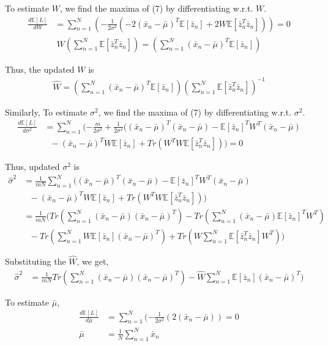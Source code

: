 \begin{enumerate}
	To estimate $W$, we find the maxima of (7) by differentiating w.r.t. $W$. 
	\begin{align*}
		\frac{d\mathbb{E}[L]}{dW} &= \sum_{n = 1}^N ( -\frac{1}{2 \sigma^2} ( - 2 (\bar{x}_n - \bar{\mu})^T\mathbb{E}[\bar{z}_n] + 2W\mathbb{E}[\bar{z}_n^T\bar{z}_n])) = 0 \nonumber 
	\end{align*}
	\begin{align*}
		W(\sum_{n = 1}^N \mathbb{E}[\bar{z}_n^T\bar{z}_n]) = (\sum_{n = 1}^N (\bar{x}_n - \bar{\mu})^T\mathbb{E}[\bar{z}_n] )
	\end{align*}
	
	Thus, the updated $W$ is 
	\begin{align}
		\hat{W} = (\sum_{n = 1}^N (\bar{x}_n - \bar{\mu})^T\mathbb{E}[\bar{z}_n] )(\sum_{n = 1}^N \mathbb{E}[\bar{z}_n^T\bar{z}_n])^{-1}
	\end{align}
	
	Similarly, To estimate $\sigma^2$, we find the maxima of (7) by differentiating w.r.t. $\sigma^2$. 
	\begin{align*}
		\frac{d\mathbb{E}[L]}{d\sigma^2} &= \sum_{n = 1}^N ( -\frac{m}{2\sigma^2} + \frac{1}{2 \sigma^4} ((\bar{x}_n - \bar{\mu})^T (\bar{x}_n -  \bar{\mu}) - \mathbb{E}[\bar{z}_n]^TW^T(\bar{x}_n - \bar{\mu}) \nonumber
		\\ & \: \: \: - (\bar{x}_n - \bar{\mu})^TW\mathbb{E}[\bar{z}_n] + Tr(W^TW \mathbb{E}[\bar{z}_n^T\bar{z}_n])) = 0
	\end{align*}
	
	Thus, updated $\sigma^2$ is
	\begin{align*}
		\hat{\sigma}^2 &= \frac{1}{mN} \sum_{n = 1}^N ((\bar{x}_n - \bar{\mu})^T (\bar{x}_n -  \bar{\mu}) - \mathbb{E}[\bar{z}_n]^TW^T(\bar{x}_n - \bar{\mu}) \nonumber
		\\ & \: \: \: - (\bar{x}_n - \bar{\mu})^TW\mathbb{E}[\bar{z}_n] + Tr(W^TW \mathbb{E}[\bar{z}_n^T\bar{z}_n])) \\
				       &= \frac{1}{mN} (Tr(\sum_{n = 1}^N (\bar{x}_n - \bar{\mu}) (\bar{x}_n -  \bar{\mu})^T) - Tr(\sum_{n = 1}^N (\bar{x}_n - \bar{\mu}) \mathbb{E}[\bar{z}_n]^TW^T ) \nonumber
		\\ & \: \: \: - Tr(\sum_{n = 1}^N W\mathbb{E}[\bar{z}_n] (\bar{x}_n - \bar{\mu})^T)+ Tr(W \sum_{n = 1}^N \mathbb{E}[\bar{z}_n^T\bar{z}_n] W^T))
	\end{align*}
	
	Substituting the $\hat{W}$, we get, 
	\begin{align}
		\hat{\sigma}^2 &= \frac{1}{mN} Tr(\sum_{n = 1}^N (\bar{x}_n - \bar{\mu}) (\bar{x}_n -  \bar{\mu})^T) - \hat{W} \sum_{n = 1}^N \mathbb{E}[\bar{z}_n] (\bar{x}_n - \bar{\mu})^T)
	\end{align}
	
	To estimate $\bar{\mu}$,
	\begin{align}
		\frac{d\mathbb{E}[L]}{d\bar{\mu}} &= \sum_{n = 1}^N ( -\frac{1}{2 \sigma^2} ( 2 (\bar{x}_n - \bar{\mu})) = 0 \nonumber \\
		\bar{\mu} &= \frac{1}{N} \sum_{n = 1}^N \bar{x}_n
	\end{align}
	
\end{enumerate}

